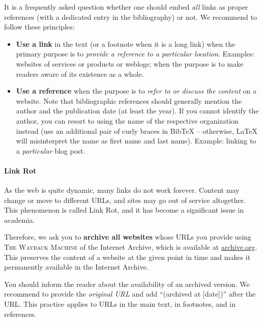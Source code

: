 It is a frequently asked question whether one should embed \emph{all} links as proper references (with a dedicated entry in the bibliography) or not. We recommend to follow these principles:
\begin{itemize}
  \item \textbf{Use a link} in the text (or a footnote when it is a long link) when the primary purpose is to \emph{provide a reference to a particular location}. Examples: websites of services or products or weblogs; when the purpose is to make readers aware of its existence as a whole.
  \item \textbf{Use a reference} when the purpose is to \emph{refer to or discuss the content} on a website. Note that bibliographic references should generally mention the author and the publication date (at least the year). If you cannot identify the author, you can resort to using the name of the respective organization instead (use an additional pair of curly braces in BibTeX -- otherwise, LaTeX will misinterpret the name as first name and last name). Example: linking to a \emph{particular} blog post.
\end{itemize}

\paragraph{Link Rot}

As the web is quite dynamic, many links do not work forever.
Content may change or move to different URLs, and sites may go out of service altogether. This phenomenon is called Link Rot, and it has become a significant issue in academia.

Therefore, we ask you to \textbf{archive all websites} whose URLs you provide using \textsc{The Wayback Machine} of the Internet Archive, which is available at \url{archive.org}.
This preserves the content of a website at the given point in time and makes it permanently available in the Internet Archive.

You should inform the reader about the availability of an archived version.
We recommend to provide the \emph{original URL} and add ``(archived at [date])'' after the URL.%
This practice applies to URLs in the main text, in footnotes, and in references.

